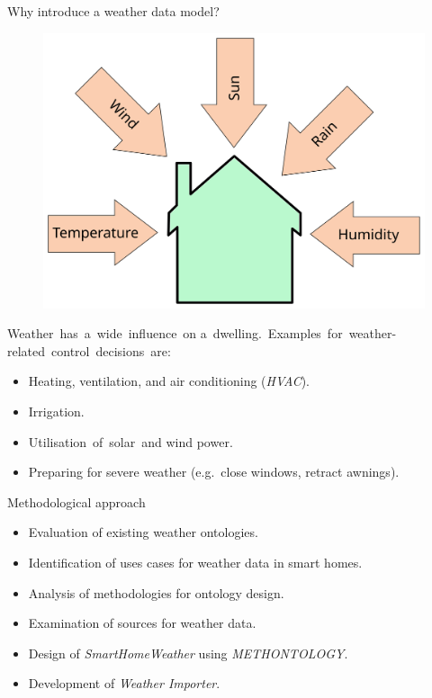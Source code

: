 \documentclass[final,hyperref={pdfpagelabels=true}]{beamer}
\begin{document}
\begin{frame}[fragile]
\begin{columns}[t]
\begin{column}{.45\textwidth}
      \begin{block}{Why introduce a weather data model?}
        \begin{figure}
	  \vspace{-.5em}
	  \centering
	  \includegraphics[width=.45\textwidth]{figures/inkscape/house}
	\end{figure}

	\vspace{-1.5em}
	
	\mbox{Weather has a wide influence on}
	\mbox{a dwelling. Examples for weather-}
	\mbox{related control decisions are:}
	
	\begin{itemize}
  	  \item Heating, ventilation, and air conditioning (\emph{HVAC}).
	  \item Irrigation.
	  \item \mbox{Utilisation of solar and} wind power.
	\end{itemize}

	\vspace{-.2em}
	\begin{itemize}
	  \item Preparing for severe weather (e.g.\ close windows, retract awnings).
	\end{itemize}
      \end{block}

      \begin{block}{Methodological approach}
	\vspace{-.5em}
	\begin{itemize}
	  \item Evaluation of existing weather ontologies.
	  \item Identification of uses cases for weather data in smart homes.
	  \item Analysis of methodologies for ontology design.
	  \item Examination of sources for weather data.
	  \item Design of \emph{SmartHomeWeather} using \emph{METHONTOLOGY}. %
	  \item Development of \emph{Weather Importer}.
	\end{itemize}
      \end{block}


\end{column}
\end{columns}
\end{frame}
\end{document}
